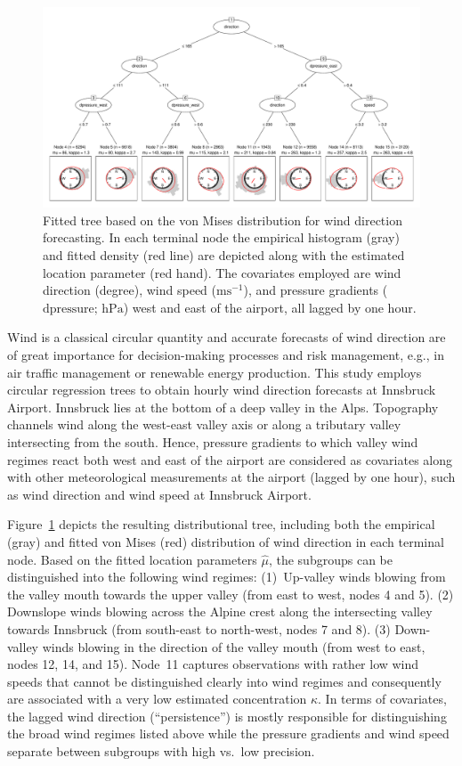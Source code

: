 \documentclass[twoside]{report}
\begin{document}
\begin{figure}[p!]\centering
\includegraphics[height = .5\textheight,angle=90,origin=c]{schlosser-circtree_plot.pdf}
\caption{Fitted tree based on the von Mises distribution for wind direction forecasting.
In each terminal node the empirical histogram (gray) and fitted density (red line)
are depicted along with the estimated location parameter (red hand). The covariates
employed are wind direction (degree), wind speed ($\text{ms}^{-1}$),
and pressure gradients ($\text{dpressure; hPa}$) west and east of the airport,
all lagged by one hour.}
\label{schlosser:fig_tree} \end{figure}

Wind is a classical circular quantity and accurate forecasts of wind direction
are of great importance for decision-making processes and risk management,
e.g., in air traffic management or renewable energy production. This study
employs circular regression trees to obtain hourly wind direction
forecasts at Innsbruck Airport.
Innsbruck lies at the bottom of a deep valley in the Alps. Topography
channels wind along the west-east valley axis or along a tributary valley
intersecting from the south. Hence, pressure gradients to which valley wind
regimes react both west and east of the airport are considered as covariates
along with other meteorological measurements at the airport (lagged by one hour),
such as wind direction and wind speed at Innsbruck Airport.

Figure~\ref{schlosser:fig_tree} depicts the resulting distributional tree, including
both the empirical (gray) and fitted von Mises (red) distribution of wind direction
in each terminal node. Based on the fitted location parameters $\hat \mu$, the subgroups
can be distinguished into the following wind regimes:
(1)~Up-valley winds blowing from the valley mouth towards the upper valley
(from east to west, nodes 4 and 5). (2) Downslope winds blowing across
the Alpine crest along the intersecting valley towards Innsbruck (from south-east to
north-west, nodes 7 and 8). (3) Down-valley winds blowing in the direction
of the valley mouth (from west to east, nodes 12, 14, and 15). Node~11
captures observations with rather low wind speeds that cannot be distinguished
clearly into wind regimes and consequently are associated with a very low
estimated concentration $\hat \kappa$. In terms of covariates, the lagged
wind direction (``persistence'') is mostly responsible for distinguishing
the broad wind regimes listed above while the pressure gradients and wind
speed separate between subgroups with high vs.\ low precision.
\end{document}
